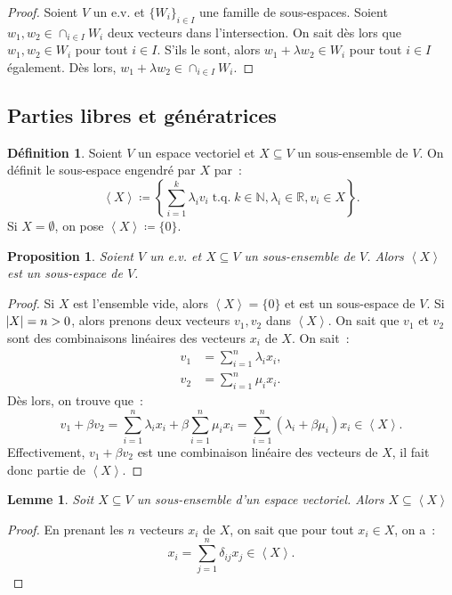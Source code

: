 \documentclass{article}
\DeclareMathOperator{\tq}{\text{ t.q. }}
\newcommand{\N}{\mathbb N}
\newcommand{\R}{\mathbb R}
\newcommand{\eng}[1]{\left\langle#1\right\rangle}
\newtheorem{prp}[thm]{Proposition}
\newtheorem{lem}[thm]{Lemme}
\theoremstyle{definition}
\newtheorem{déf}[thm]{Définition}
\theoremstyle{remark}
\begin{document}
		\begin{proof} Soient $V$ un e.v. et $\{W_i\}_{i \in I}$ une famille de sous-espaces. Soient $w_1, w_2 \in \cap_{i \in I}W_i$ deux vecteurs dans l'intersection.
		On sait dès lors que $w_1, w_2 \in W_i$ pour tout $i \in I$. S'ils le sont, alors $w_1 + \lambda w_2 \in W_i$ pour tout $i \in I$ également. Dès lors,
		$w_1 + \lambda w_2 \in \cap_{i \in I}W_i$. \end{proof}

	\subsection{Parties libres et génératrices}
		\begin{déf} Soient $V$ un espace vectoriel et $X \subseteq V$ un sous-ensemble de $V$. On définit le sous-espace engendré par $X$ par~:
		\[\eng X \coloneqq \left\{\sum_{i=1}^k\lambda_iv_i \tq k \in \N, \lambda_i \in \R, v_i \in X\right\}.\] Si $X = \emptyset$, on pose $\eng X \coloneqq \{0\}$.
		\end{déf}

		\begin{prp} Soient $V$ un e.v. et $X \subseteq V$ un sous-ensemble de $V$. Alors $\eng X$ est un sous-espace de $V$. \end{prp}

		\begin{proof} Si $X$ est l'ensemble vide, alors $\eng X = \{0\}$ et est un sous-espace de $V$. Si $\abs X = n > 0$, alors prenons deux vecteurs $v_1, v_2$ dans
		$\eng X$. On sait que $v_1$ et $v_2$ sont des combinaisons linéaires des vecteurs $x_i$ de $X$. On sait~:
		\begin{align*}
			v_1 &= \sum_{i=1}^n\lambda_ix_i, \\
			v_2 &= \sum_{i=1}^n\mu_ix_i.
		\end{align*}
		Dès lors, on trouve que~: \[v_1 + \beta v_2 = \sum_{i=1}^n\lambda_ix_i + \beta\sum_{i=1}^n\mu_ix_i = \sum_{i=1}^n(\lambda_i + \beta\mu_i)x_i \in \eng X.\]
		Effectivement, $v_1 + \beta v_2$ est une combinaison linéaire des vecteurs de $X$, il fait donc partie de $\eng X$. \end{proof}

		\begin{lem}\label{X<<X>} Soit $X \subseteq V$ un sous-ensemble d'un espace vectoriel. Alors $X \subseteq \eng X$ \end{lem}

		\begin{proof} En prenant les $n$ vecteurs $x_i$ de $X$, on sait que pour tout $x_i \in X$, on a~:\[x_i = \sum_{j=1}^n\delta_{ij}x_j \in \eng X.\] \end{proof}
\end{document}
